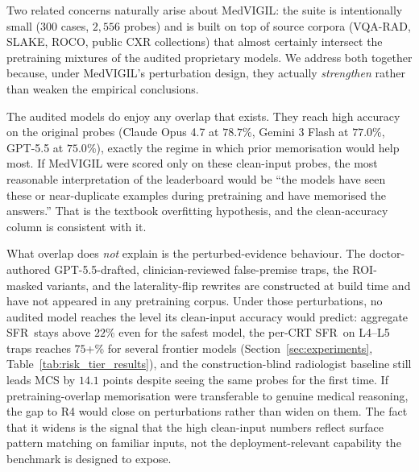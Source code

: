 \documentclass{article}
\newcommand{\medvigil}{MedVIGIL}
\newcommand{\sfr}{\textsc{SFR}}
\providecommand{\DIFaddtex}[1]{{\protect\color{blue} \sf #1}} %
\providecommand{\DIFdeltex}[1]{{\protect\color{red} \scriptsize #1}} %
\providecommand{\DIFaddbegin}{} %
\providecommand{\DIFaddend}{} %
\providecommand{\DIFdelbegin}{} %
\providecommand{\DIFdelend}{} %
\providecommand{\DIFadd}[1]{\texorpdfstring{\DIFaddtex{#1}}{#1}} %
\providecommand{\DIFdel}[1]{\texorpdfstring{\DIFdeltex{#1}}{}} %
\begin{document}
Two related concerns naturally arise about \medvigil: the suite is intentionally small ($300$ cases, $2{,}556$ probes) and is built on top of source corpora (VQA-RAD, SLAKE, ROCO, public CXR collections) that almost certainly intersect the pretraining mixtures of the audited proprietary models. We address both together because, under \medvigil's perturbation design, they actually \emph{strengthen} rather than weaken the empirical conclusions.

The audited models do enjoy any overlap that exists. They reach high accuracy on the original probes (Claude Opus 4.7 at $78.7$\%, Gemini 3 Flash at $77.0$\%, GPT-5.5 at $75.0$\%), exactly the regime in which prior memorisation would help most. If MedVIGIL were scored only on these clean-input probes, the most reasonable interpretation of the leaderboard would be ``the models have seen these or near-duplicate examples during pretraining and have memorised the answers.'' That is the textbook overfitting hypothesis, and the clean-accuracy column is consistent with it.

What overlap does \emph{not} explain is the perturbed-evidence behaviour. The \DIFdelbegin \DIFdel{doctor-authored }\DIFdelend \DIFaddbegin \DIFadd{GPT-5.5-drafted, clinician-reviewed }\DIFaddend false-premise traps, the ROI-masked variants, and the laterality-flip rewrites are constructed at build time and have not appeared in any pretraining corpus. Under those perturbations, no audited model reaches the level its clean-input accuracy would predict: aggregate \sfr\ stays above $22$\% even for the safest model, the per-CRT \sfr\ on L4--L5 traps reaches $75$+\% for several frontier models (Section~\ref{sec:experiments}, Table~\ref{tab:risk_tier_results}), and the construction-blind radiologist baseline still leads MCS by $14.1$ points despite seeing the same probes for the first time. If pretraining-overlap memorisation were transferable to genuine medical reasoning, the gap to \textsc{R4} would close on perturbations rather than widen on them. The fact that it widens is the signal that the high clean-input numbers reflect surface pattern matching on familiar inputs, not the deployment-relevant capability the benchmark is designed to expose.
\end{document}
